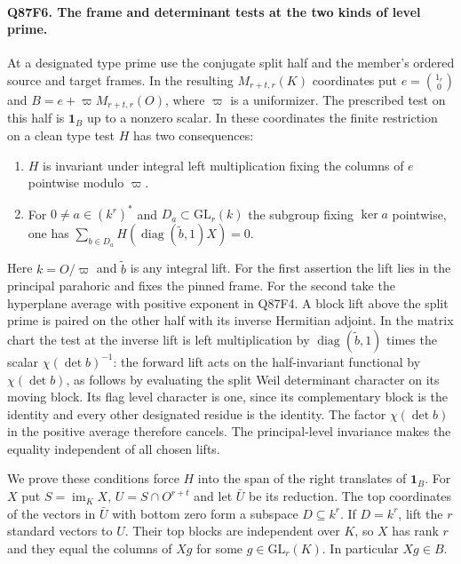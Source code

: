 \paragraph{Q87F6. The frame and determinant tests at the two kinds of level prime.}
At a designated type prime use the conjugate split half and the
member's ordered source and target frames. In the resulting
$M_{r+t,r}(K)$ coordinates put $e=\binom{1_r}{0}$ and
$B=e+\varpi M_{r+t,r}(O)$, where $\varpi$ is a uniformizer.
The prescribed test on this half is $\mathbf1_B$ up to a nonzero
scalar. In these coordinates the finite restriction on a clean
type test $H$ has two consequences:
\begin{enumerate}
\item $H$ is invariant under integral left multiplication fixing
the columns of $e$ pointwise modulo $\varpi$.
\item For $0\ne a\in(k^r)^*$ and $D_a\subset\mathrm{GL}_r(k)$
the subgroup fixing $\ker a$ pointwise, one has
$\sum_{b\in D_a}H(\operatorname{diag}(\widetilde b,1)X)=0$.
\end{enumerate}
Here $k=O/\varpi$ and $\widetilde b$ is any integral lift. For the
first assertion the lift lies in the principal parahoric and fixes
the pinned frame. For the second take the hyperplane average with
positive exponent in Q87F4. A block lift above the split prime is
paired on the other half with its inverse Hermitian adjoint.
In the matrix chart the test at the inverse lift is left
multiplication by $\operatorname{diag}(\widetilde b,1)$ times the scalar
$\chi(\det b)^{-1}$: the forward lift acts on the half-invariant
functional by $\chi(\det b)$, as follows by evaluating the split
Weil determinant character on its moving block. Its flag level
character is one, since its complementary block is the identity
and every other designated residue is the identity. The factor
$\chi(\det b)$ in the positive average therefore cancels. The principal-level invariance
makes the equality independent of all chosen lifts.

We prove these conditions force $H$ into the span of the right
translates of $\mathbf1_B$. For $X$ put $S=\operatorname{im}_K X$,
$U=S\cap O^{r+t}$ and let $\bar U$ be its reduction. The top
coordinates of the vectors in $\bar U$ with bottom zero form a
subspace $D\subseteq k^r$. If $D=k^r$, lift the $r$ standard
vectors to $U$. Their top blocks are independent over $K$, so $X$
has rank $r$ and they equal the columns of $Xg$ for some
$g\in\mathrm{GL}_r(K)$. In particular $Xg\in B$.

